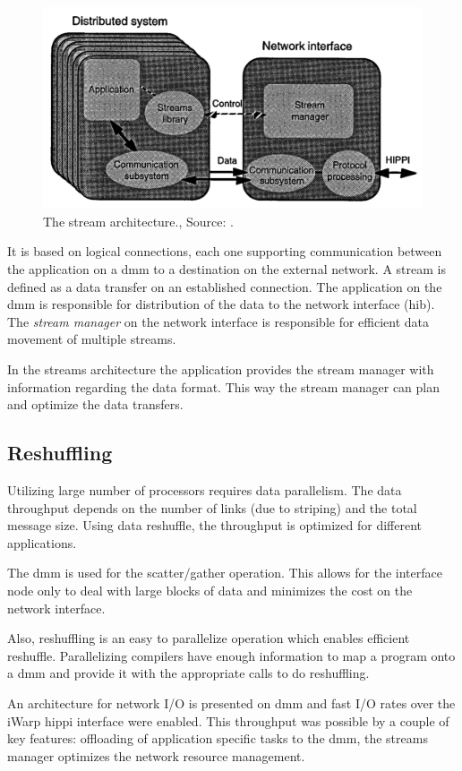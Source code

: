 \begin{figure}
    \centering
	\includegraphics[width=0.95\linewidth]{Figures/Rep4streamsarchitecture.png}
	\caption{The stream architecture., Source: \cite{steenkiste1997high}.}
    \label{fig:rep4:streams}
\end{figure}

It is based on logical connections, each one supporting communication between the application on a \ac{dmm} to a destination on the external network.
A stream is defined as a data transfer on an established connection.
The application on the \ac{dmm} is responsible for distribution of the data to the network interface (\ac{hib}).
The \textit{stream manager} on the network interface is responsible for efficient data movement of multiple streams.

In the streams architecture the application provides the stream manager with information regarding the data format. 
This way the stream manager can plan and optimize the data transfers.


\subsection{Reshuffling}
Utilizing large number of processors requires data parallelism.
The data throughput depends on the number of links (due to striping) and the total message size.
Using data reshuffle, the throughput is optimized for different applications.

The \ac{dmm} is used for the scatter/gather operation.
This allows for the interface  node only to deal with large blocks of data and minimizes the cost on the network interface.

Also, reshuffling is an easy to parallelize operation which enables efficient reshuffle.
Parallelizing compilers have enough information to map a program onto a \ac{dmm} and provide it with the appropriate calls to do reshuffling.

An architecture for network I/O is presented on \acs{dmm} and fast I/O rates over the iWarp \ac{hippi} interface were enabled.
This throughput was possible by a couple of key features: offloading of application specific tasks to the \ac{dmm}, the streams manager optimizes the network resource management.


